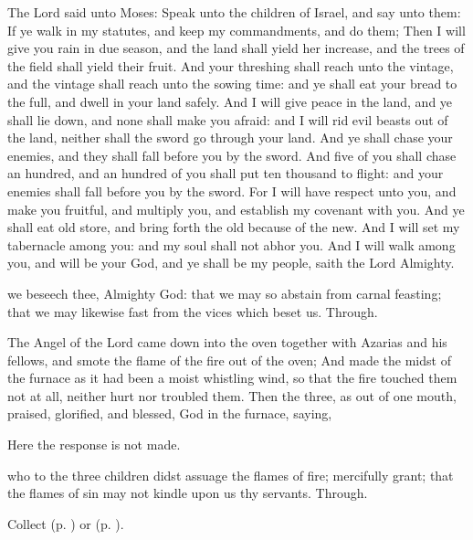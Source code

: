  The Lord said unto Moses: Speak unto the children of Israel, and say unto them: If ye walk in my statutes, and keep my commandments, and do them; Then I will give you rain in due season, and the land shall yield her increase, and the trees of the field shall yield their fruit. And your threshing shall reach unto the vintage, and the vintage shall reach unto the sowing time: and ye shall eat your bread to the full, and dwell in your land safely. And I will give peace in the land, and ye shall lie down, and none shall make you afraid: and I will rid evil beasts out of the land, neither shall the sword go through your land. And ye shall chase your enemies, and they shall fall before you by the sword. And five of you shall chase an hundred, and an hundred of you shall put ten thousand to flight: and your enemies shall fall before you by the sword. For I will have respect unto you, and make you fruitful, and multiply you, and establish my covenant with you. And ye shall eat old store, and bring forth the old because of the new. And I will set my tabernacle among you: and my soul shall not abhor you. And I will walk among you, and will be your God, and ye shall be my people, saith the Lord Almighty.


\collect
{} we beseech thee, Almighty God: that we may so abstain from carnal feasting; that we may likewise fast from the vices which beset us. Through.

 The Angel of the Lord came down into the oven together with Azarias and his fellows, and smote the flame of the fire out of the oven; And made the midst of the furnace as it had been a moist whistling wind, so that the fire touched them not at all, neither hurt nor troubled them. Then the three, as out of one mouth, praised, glorified, and blessed, God in the furnace, saying,
\begin{rubric}
    Here the response  is not made.
\end{rubric}



\collect
{} who to the three children didst assuage the flames of fire; mercifully grant; that the flames of sin may not kindle upon us thy servants. Through.
\begin{rubric}
     Collect  (p. \pageref{SPAgainst}) or  (p. \pageref{SPChiefBishop}).
\end{rubric}


